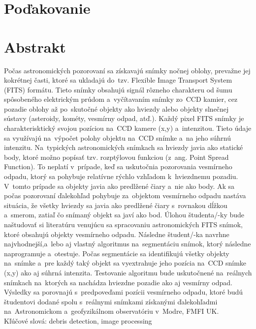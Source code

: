 \documentclass[12pt, a4paper, oneside]{book}
\begin{document}
\chapter*{Poďakovanie}\label{chap:thank_you}
\vfill\eject

\chapter*{Abstrakt}\label{chap:abstract_sk}
Počas astronomických pozorovaní sa získavajú snímky nočnej oblohy, prevažne jej kokrétnej časti, ktoré sa ukladajú do tzv. Flexible Image Transport System (FITS) formátu. Tieto snímky obsahujú signál rôzneho charakteru od šumu spôsobeného elektrickým prúdom a vyčítavaním snímky zo CCD kamier, cez pozadie oblohy až po skutočné objekty ako hviezdy alebo objekty slnečnej sústavy (asteroidy, kométy, vesmírny odpad, atď.). Každý pixel FITS snímky je charakterisktický svojou pozíciou na CCD kamere (x,y) a intenzitou. Tieto údaje sa využívajú na výpočet polohy objektu na CCD snímke a na jeho súhrnú intenzitu.
Na typických astronomických snímkach sa hviezdy javia ako statické body, ktoré možno popísať tzv. rozptýlovou funkciou (z ang. Point Spread Function). To neplatí v prípade, keď sa uskutočnia pozorovania vesmírneho odpadu, ktorý sa pohybuje relatívne rýchlo vzhľadom k hviezdnemu pozadiu. V tomto prípade sa objekty javia ako predlžené čiary a nie ako body. Ak sa počas pozorovaní ďalekohľad pohybuje za objektom vesmírneho odpadu nastáva situácia, že všetky hviezdy sa javia ako predlžené čiary s rovnakou dĺžkou a smerom, zatiaľ čo snímaný objekt sa javí ako bod.
Úlohou študenta/-ky bude naštudovať si literatúru venujúcu sa spracovaniu astronomických FITS snímok, ktoré obsahujú objekty vesmírneho odpadu. Následne študent/-ka navrhne najvhodnejší,a lebo aj vlastný algoritmus na segmentáciu snímok, ktorý následne naprogramuje a otestuje. Počas segmentácie sa identifikujú všetky objekty na snímke a pre každý taký objekt sa vyextrahuje jeho pozícia na CCD snímke (x,y) ako aj súhrná intenzita. Testovanie algoritmu bude uskutočnené na reálnych snímkach na ktorých sa nachádza hviezdne pozadie ako aj vesmírny odpad. Výsledky sa porovnajú s predpoveďami pozícii vesmírneho odpadu, ktoré budú študentovi dodané spolu s reálnymi snímkami získanými ďalekohľadmi na Astronomickom a geofyzikálnom observatóriu v Modre, FMFI UK.
~\\
Kľúčové slová: debris detection, image processing
\vfill\eject
\end{document}
